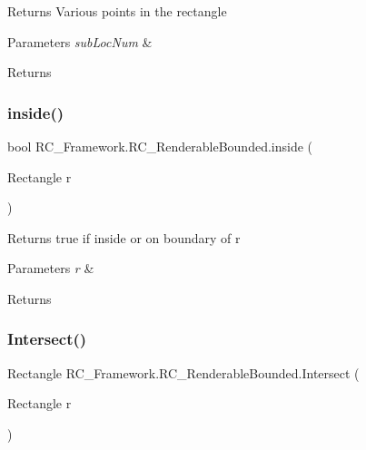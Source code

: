 Returns Various points in the rectangle 


\begin{DoxyParams}{Parameters}
{\em sub\+Loc\+Num} & \\
\hline
\end{DoxyParams}
\begin{DoxyReturn}{Returns}

\end{DoxyReturn}
\mbox{\label{class_r_c___framework_1_1_r_c___renderable_bounded_a126c01971f9ab5ac288b84aa985117e1}} 
\subsubsection{\texorpdfstring{inside()}{inside()}}
{\footnotesize\ttfamily bool R\+C\+\_\+\+Framework.\+R\+C\+\_\+\+Renderable\+Bounded.\+inside (\begin{DoxyParamCaption}\item[{Rectangle}]{r }\end{DoxyParamCaption})}



Returns true if inside or on boundary of r 


\begin{DoxyParams}{Parameters}
{\em r} & \\
\hline
\end{DoxyParams}
\begin{DoxyReturn}{Returns}

\end{DoxyReturn}
\mbox{\label{class_r_c___framework_1_1_r_c___renderable_bounded_a744532d85e586e0aa52f75dd1af3f60f}} 
\subsubsection{\texorpdfstring{Intersect()}{Intersect()}}
{\footnotesize\ttfamily Rectangle R\+C\+\_\+\+Framework.\+R\+C\+\_\+\+Renderable\+Bounded.\+Intersect (\begin{DoxyParamCaption}\item[{Rectangle}]{r }\end{DoxyParamCaption})}



